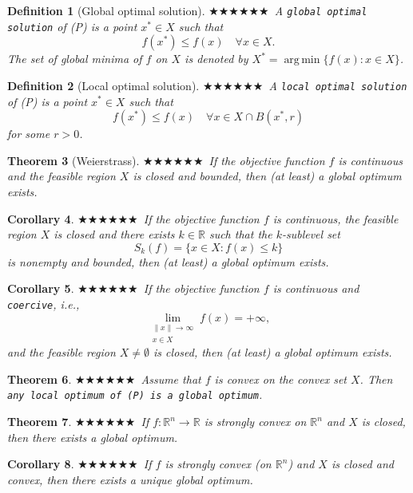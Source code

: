\documentclass[11pt,a4paper]{article}
\newcommand{\g}{\texttt}
\newcommand{\R}{\mathbb{R}}
\newcommand{\norm}[1]{\left\lVert #1 \right\rVert}
\DeclareMathOperator*{\argmin}{arg\,min}
\theoremstyle{breakdef}
\newtheorem{definition}{Definition}[section]
\theoremstyle{breakplain}
\newtheorem{theorem}[definition]{Theorem}
\newtheorem{corollary}[definition]{Corollary}
\theoremstyle{remark}
\newcommand{\imp}[1]{\textcolor{impcolor}{%
  \ifcase#1\or$\bigstar$\or$\bigstar\bigstar$\or$\bigstar\bigstar\bigstar$\fi}\ }
\begin{document}
\begin{definition}[Global optimal solution]
\imp{2}A \g{global optimal solution} of (P) is a point $x^* \in X$ such that
\[
    f(x^*) \le f(x) \quad \forall x \in X.
\]
The set of global minima of $f$ on $X$ is denoted by $X^* = \argmin\{f(x) : x \in X\}$.
\end{definition}

\begin{definition}[Local optimal solution]
\imp{2}A \g{local optimal solution} of (P) is a point $x^* \in X$ such that
\[
    f(x^*) \le f(x) \quad \forall x \in X \cap B(x^*, r)
\]
for some $r > 0$.
\end{definition}

\begin{theorem}[Weierstrass]
\imp{3}If the objective function $f$ is continuous and the feasible region $X$ is closed and bounded, then (at least) a global optimum exists.
\end{theorem}

\begin{corollary}
\imp{3}If the objective function $f$ is continuous, the feasible region $X$ is closed and there exists $k \in \R$ such that the $k$-sublevel set
\[
    S_k(f) = \{x \in X : f(x) \le k\} \tag{1}
\]
is nonempty and bounded, then (at least) a global optimum exists.
\end{corollary}

\begin{corollary}
\imp{3}If the objective function $f$ is continuous and \g{coercive}, i.e.,
\[
    \lim_{\substack{\norm{x} \to \infty \\ x \in X}} f(x) = +\infty, \tag{2}
\]
and the feasible region $X \ne \emptyset$ is closed, then (at least) a global optimum exists.
\end{corollary}

\begin{theorem}
    \imp{3}Assume that $f$ is convex on the convex set $X$. Then \g{any local optimum of (P) is a global optimum}.
\end{theorem}

\begin{theorem}
    \imp{2}If $f: \R^n \to \R$ is strongly convex on $\R^n$ and $X$ is closed, then there exists a global optimum.
\end{theorem}

\begin{corollary}
    \imp{3}If $f$ is strongly convex (on $\R^n$) and $X$ is closed and convex, then there exists a unique global optimum.
\end{corollary}
\end{document}

